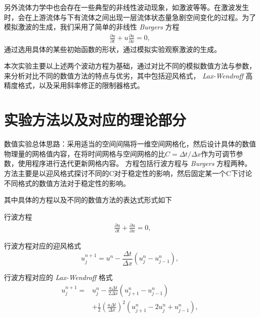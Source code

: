 \documentclass[10.5pt
]{article}
\begin{document}
另外流体力学中也会存在一些典型的非线性波动现象，如激波等等。在激波发生时，会在上游流体与下有流体之间出现一层流体状态量急剧空间变化的过程。为了模拟激波的生成，我们采用了简单的非线性 \textit{Burgers} 方程
\begin{align}
\frac{\partial u}{\partial t} + u \frac{\partial u}{\partial x} = 0, \label{EqnBurgers}
\end{align}
通过选用具体的某些初始函数的形状，通过模拟实验观察激波的生成。

本次实验主要以上述两个波动方程为基础，通过对比不同的模拟数值方法与参数，来分析对比不同的数值方法的特点与优劣，其中包括迎风格式， \textit{Lax-Wendroff} 高精度格式，以及采用斜率修正的限制器格式。

\section{实验方法以及对应的理论部分}
数值实验总体思路：采用适当的空间间隔将一维空间网格化，然后设计具体的数值物理量的网格值内容，在将时间网格与空间网格的比$C = \Delta t / \Delta x$作为可调节参数，使用程序进行迭代更新网格内容。
方程包括行波方程与 \textit{Burgers} 方程两种。方法主要是以迎风格式探讨不同的C对于稳定性的影响，然后固定某一个C下讨论不同格式的数值方法对于稳定性的影响。

其中具体的方程以及不同的数值方法的表达式形式如下

行波方程
\begin{align}
& \frac{\partial u}{\partial t} + \frac{\partial u}{\partial x} = 0,
\label{EqnCon}
\end{align}

行波方程对应的迎风格式\cite{he_volume-preserving_2015}
\begin{equation}
u_j^{n+1} = u^n - \frac{\Delta t}{\Delta x} (u_j^n - u_{j-1}^n), \label{EqnUpwind}
\end{equation}

行波方程对应的 \textit{Lax-Wendroff} 格式
\begin{align}
	u_j^{n+1} 
	=&
	u_j^{n} 
	-
	\frac{a \Delta t}{ 2 \Delta x } (  	u_{j+1}^{n} - u_{j-1}^{n} ) \\
	&+ \frac{1}{2} \left( \frac{a \Delta t}{ \Delta x } \right)^2 (  	u_{j+1}^{n}- 2 u_j^n + u_{j-1}^{n} ),
\end{align}
\end{document}
